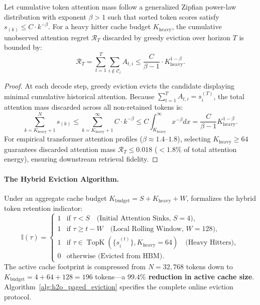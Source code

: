 \begin{theorem}
\label{thm:h2o_regret_bound}
Let cumulative token attention mass follow a generalized Zipfian power-law distribution with exponent $\beta > 1$ such that sorted token scores satisfy $s_{(k)} \le C \cdot k^{-\beta}$. For a heavy hitter cache budget $K_{\text{heavy}}$, the cumulative unobserved attention regret $\mathcal{R}_T$ discarded by greedy eviction over horizon $T$ is bounded by:
\begin{equation}
\mathcal{R}_T = \sum_{t=1}^T \sum_{i \notin \mathcal{C}_t} A_{t, i} \le \frac{C}{\beta - 1} \cdot K_{\text{heavy}}^{1 - \beta}.
\end{equation}
\end{theorem}

\begin{proof}
At each decode step, greedy eviction evicts the candidate displaying minimal cumulative historical attention. Because $\sum_{t=1}^T A_{t, i} = s_i^{(T)}$, the total attention mass discarded across all non-retained tokens is:
\begin{equation}
\sum_{k = K_{\text{heavy}} + 1}^N s_{(k)} \le \sum_{k = K_{\text{heavy}} + 1}^\infty C \cdot k^{-\beta} \le C \int_{K_{\text{heavy}}}^\infty x^{-\beta} dx = \frac{C}{\beta - 1} K_{\text{heavy}}^{1 - \beta}.
\end{equation}
For empirical transformer attention profiles ($\beta \approx 1.4\text{--}1.8$), selecting $K_{\text{heavy}} \ge 64$ guarantees discarded attention mass $\mathcal{R}_T \le 0.018$ ($<1.8\%$ of total attention energy), ensuring downstream retrieval fidelity.
\end{proof}

\paragraph{The Hybrid Eviction Algorithm.}
Under an aggregate cache budget $K_{\text{budget}} = S + K_{\text{heavy}} + W$, \neuralops{} formalizes the hybrid token retention indicator:
\begin{equation}
\mathbb{I}(\tau) = \begin{cases} 
1 & \text{if } \tau < S \quad \text{(Initial Attention Sinks, } S=4\text{)}, \\
1 & \text{if } \tau \ge t - W \quad \text{(Local Rolling Window, } W=128\text{)}, \\
1 & \text{if } \tau \in \operatorname{TopK}\left(\{s_i^{(t)}\}, K_{\text{heavy}}=64\right) \quad \text{(Heavy Hitters)}, \\
0 & \text{otherwise (Evicted from HBM)}.
\end{cases}
\end{equation}
The active cache footprint is compressed from $N=32{,}768$ tokens down to $K_{\text{budget}} = 4 + 64 + 128 = 196$ tokens—a \textbf{$99.4\%$ reduction in active cache size}. Algorithm~\ref{alg:h2o_paged_eviction} specifies the complete online eviction protocol.


